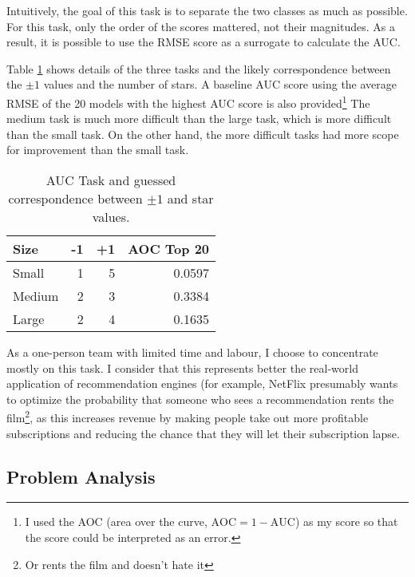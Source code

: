 \documentclass{article}
\begin{document}
Intuitively, the goal of this task is to separate the two classes as much as possible.  For this task, only the order of the scores mattered, not their magnitudes.  As a result, it is possible to use the RMSE score as a surrogate to calculate the AUC.

Table \ref{auc} shows details of the three tasks and the likely correspondence between the $\pm 1$ values and the number of stars.  A baseline AUC score using the average RMSE of the 20 models with the highest AUC score is also provided\footnote{I used the AOC (area over the curve, $\mathrm{AOC} = 1 - \mathrm{AUC}$) as my score so that the score could be interpreted as an error.}
The medium task is much more difficult than the large task, which is more difficult than the small task.  On the other hand, the more difficult tasks had more scope for improvement than the small task.

\begin{table}[t]
\caption{AUC Task and guessed correspondence between $\pm 1$ and star values.}
\label{auc}
\vskip 0.15in
\begin{center}
\begin{small}
\begin{sc}
\begin{tabular}{lrrr}
\hline
\abovespace\belowspace
Size & -1 & +1 & AOC Top 20 \\
\hline
\abovespace
Small    & 1 & 5 & 0.0597 \\
Medium   & 2 & 3 & 0.3384 \\
\belowspace
Large    & 2 & 4 & 0.1635 \\
\hline
\end{tabular}
\end{sc}
\end{small}
\end{center}
\vskip -0.1in
\end{table}

As a one-person team with limited time and labour, I choose to concentrate mostly on this task.  I consider that this represents better the real-world application of recommendation engines (for example, NetFlix presumably wants to optimize the probability that someone who sees a recommendation rents the film\footnote{Or rents the film and doesn't hate it}, as this increases revenue by making people take out more profitable subscriptions and reducing the chance that they will let their subscription lapse.

\subsection{Problem Analysis}
\end{document}
